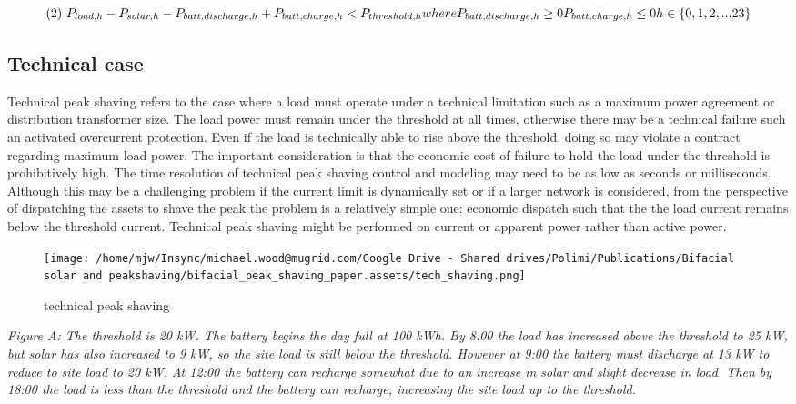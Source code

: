 \documentclass[
]{article}
\begin{document}
\[(2)\ P_{load,h} - P_{solar,h} - P_{batt,discharge,h} + P_{batt,charge,h}  < P_{threshold,h} \\
where \\
P_{batt,discharge,h} \ge 0 \\
P_{batt,charge,h} \le 0 \\
h \in \{0,1,2,...23\} \\\]

\hypertarget{technical-case}{%
\subsection{Technical case}\label{technical-case}}

Technical peak shaving refers to the case where a load must operate
under a technical limitation such as a maximum power agreement or
distribution transformer size. The load power must remain under the
threshold at all times, otherwise there may be a technical failure such
an activated overcurrent protection. Even if the load is technically
able to rise above the threshold, doing so may violate a contract
regarding maximum load power. The important consideration is that the
economic cost of failure to hold the load under the threshold is
prohibitively high. The time resolution of technical peak shaving
control and modeling may need to be as low as seconds or milliseconds.
Although this may be a challenging problem if the current limit is
dynamically set or if a larger network is considered, from the
perspective of dispatching the assets to shave the peak the problem is a
relatively simple one: economic dispatch such that the the load current
remains below the threshold current. Technical peak shaving might be
performed on current or apparent power rather than active power.

\begin{figure}
\centering
\texttt{[image: /home/mjw/Insync/michael.wood@mugrid.com/Google Drive - Shared drives/Polimi/Publications/Bifacial solar and peakshaving/bifacial\_peak\_shaving\_paper.assets/tech\_shaving.png]}
\caption{technical peak shaving}
\end{figure}

\emph{Figure A: The threshold is 20 kW. The battery begins the day full
at 100 kWh. By 8:00 the load has increased above the threshold to 25 kW,
but solar has also increased to 9 kW, so the site load is still below
the threshold. However at 9:00 the battery must discharge at 13 kW to
reduce to site load to 20 kW. At 12:00 the battery can recharge somewhat
due to an increase in solar and slight decrease in load. Then by 18:00
the load is less than the threshold and the battery can recharge,
increasing the site load up to the threshold.}
\end{document}
